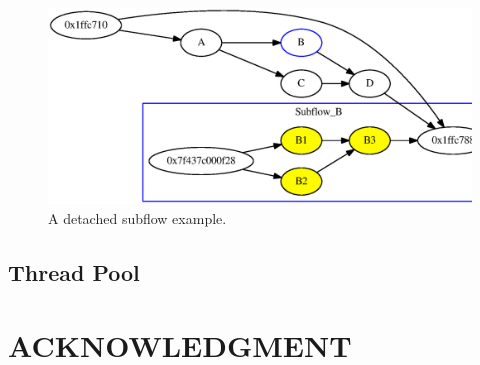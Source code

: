 \documentclass[sigconf]{acmart}
\begin{document}
\begin{figure}[htb]
 \centering
 \includegraphics[width=1.0\columnwidth]{Fig/detach.eps}
  \caption{
    A detached subflow example.
  }
 \label{fig::detach}
\end{figure}

\subsection{Thread Pool}


\section{ACKNOWLEDGMENT}




%
%


\end{document}

